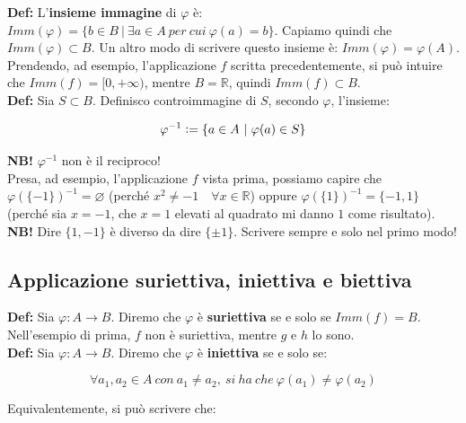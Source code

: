 \documentclass{article}
\begin{document}
\noindent \textbf{Def:} L'\textbf{insieme immagine} di $\varphi$ è: $Imm(\varphi) = \{ b \in B \ | \ \exists a \in A \ per \ cui \ \varphi(a) = b \}$. Capiamo quindi che $Imm(\varphi) \subset B$. Un altro modo di scrivere questo insieme è: $Imm(\varphi) = \varphi(A)$. \\

\noindent Prendendo, ad esempio, l'applicazione $f$ scritta precedentemente, si può intuire che $Imm(f) = [0, +\infty)$, mentre $B = \mathbb{R}$, quindi $Imm(f) \subset B$. \\

\noindent \textbf{Def:} Sia $S \subset B$. Definisco controimmagine di $S$, secondo $\varphi$, l'insieme: 

\begin{equation*}
    \varphi^{-1} \vcentcolon = \{ a \in A \ | \ \varphi(a) \in S \} 
\end{equation*}

\noindent \textbf{NB!} $\varphi^{-1}$ non è il reciproco!\\

\noindent Presa, ad esempio, l'applicazione $f$ vista prima, possiamo capire che $\varphi(\{-1\})^{-1} = \varnothing$ (perché $x^2 \neq -1 \quad \forall x \in \mathbb{R}$) oppure $\varphi(\{1\})^{-1} = \{-1, 1\}$ (perché sia $x = -1$, che $x = 1$ elevati al quadrato mi danno $1$ come risultato). \\

\noindent \textbf{NB!} Dire $\{1, -1\}$ è diverso da dire $\{\pm 1\}$. Scrivere sempre e solo nel primo modo!

\subsection{Applicazione suriettiva, iniettiva e biettiva}
\textbf{Def:} Sia $\varphi: A \xrightarrow{} B$. Diremo che $\varphi$ è \textbf{suriettiva} se e solo se $Imm(f) = B$. Nell'esempio di prima, $f$ non è suriettiva, mentre $g$ e $h$ lo sono.\\

\noindent\textbf{Def:} Sia $\varphi: A \xrightarrow{} B$. Diremo che $\varphi$ è \textbf{iniettiva} se e solo se:

\begin{equation}
    \forall a_1, a_2 \in A \ con \ a_1 \neq a_2, \ si \ ha \ che \ \varphi(a_1) \neq \varphi(a_2)
    \label{eq:7}
\end{equation}

\noindent Equivalentemente, si può scrivere che: 
\end{document}
